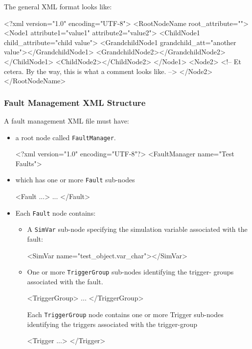 \documentclass[11pt,fleqn]{report}
\begin{document}
The general XML format looks like:
\begin{codeXML}
<?xml version="1.0" encoding="UTF-8">
<RootNodeName root_attribute="">
<Node1 attribute1="value1" attribute2="value2">
  <ChildNode1 child_attribute="child value">
    <GrandchildNode1 grandchild_att="another value"></GrandchildNode1>
    <GrandchildNode2></GrandchildNode2>
  </ChildNode1>
  <ChildNode2></ChildNode2>
</Node1>
<Node2>
  <!-- Et cetera. By the way, this is what a comment looks like. -->
</Node2>
</RootNodeName>
\end{codeXML}

\subsubsection{Fault Management XML Structure}
A fault management XML file must have:
\begin{itemize}
\item a root node called \verb"FaultManager".
\begin{codeXML}
<?xml version="1.0" encoding="UTF-8"?>
<FaultManager name="Test Faults">
\end{codeXML}
\item which has one or more \verb'Fault' sub-nodes
  \begin{codeXML}
  <Fault ...>
  ...
  </Fault>
\end{codeXML}
\item Each \verb'Fault' node contains:
  \begin{itemize}
    \item A \verb'SimVar' sub-node specifying the simulation variable associated
     with the fault:
    \begin{codeXML}
    <SimVar name="test_object.var_char"></SimVar>
    \end{codeXML}
    \item One or more \verb'TriggerGroup' sub-nodes identifying the trigger-
      groups associated with the fault.
    \begin{codeXML}
    <TriggerGroup>
    ...
    </TriggerGroup>
    \end{codeXML}
    Each \verb'TriggerGroup' node contains one or more Trigger sub-nodes
    identifying the triggers associated with the trigger-group
      \begin{codeXML}
      <Trigger ...> </Trigger>
      \end{codeXML}
  \end{itemize}
\end{itemize}
\end{document}
